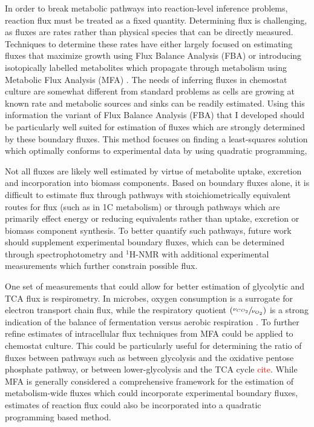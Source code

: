 In order to break metabolic pathways into reaction-level inference problems, reaction flux must be treated as a fixed quantity. Determining flux is challenging, as fluxes are rates rather than physical species that can be directly measured. Techniques to determine these rates have either largely focused on estimating fluxes that maximize growth using Flux Balance Analysis (FBA) \cite{Orth:2010hb} or introducing isotopically labelled metabolites which propagate through metabolism using Metabolic Flux Analysis (MFA) \cite{Zamboni:2009bp}. The needs of inferring fluxes in chemostat culture are somewhat different from standard problems as cells are growing at known rate and metabolic sources and sinks can be readily estimated. Using this information the variant of Flux Balance Analysis (FBA) that I developed should be particularly well suited for estimation of fluxes which are strongly determined by these boundary fluxes. This method focuses on finding a least-squares solution which optimally conforms to experimental data by using quadratic programming, 

Not all fluxes are likely well estimated by virtue of metabolite uptake, excretion and incorporation into biomass components. Based on boundary fluxes alone, it is difficult to estimate flux through pathways with stoichiometrically equivalent routes for flux (such as in 1C metabolism) or through pathways which are primarily effect energy or reducing equivalents rather than uptake, excretion or biomass component synthesis. To better quantify such pathways, future work should supplement experimental boundary fluxes, which can be determined through spectrophotometry and $^{1}$H-NMR with additional experimental measurements which further constrain possible flux.

One set of measurements that could allow for better estimation of glycolytic and TCA flux is respirometry.  In microbes, oxygen consumption is a surrogate for electron transport chain flux, while the respiratory quotient $\left(\sfrac{\nu_{CO_{2}}}{\nu_{O_{2}}}\right)$ is a strong indication of the balance of fermentation versus aerobic respiration \cite{Boer:2003fi,BARFORD:1979ei}. To further refine estimates of intracellular flux techniques from MFA could be applied to chemostat culture. This could be particularly useful for determining the ratio of fluxes between pathways such as between glycolysis and the oxidative pentose phosphate pathway, or between lower-glycolysis and the TCA cycle \textcolor{red}{cite}. While MFA is generally considered a comprehensive framework for the estimation of metabolism-wide fluxes which could incorporate experimental boundary fluxes, estimates of reaction flux could also be incorporated into a quadratic programming based method.

